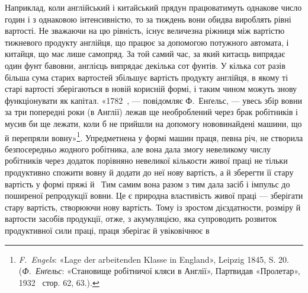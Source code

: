 Наприклад, коли англійський і китайський прядун працюватимуть
однакове число годин і з однаковою інтенсивністю, то за
тиждень вони обидва вироблять рівні вартості. Не зважаючи
на цю рівність, існує величезна ріжниця між вартістю тижневого
продукту англійця, що працює за допомогою потужного
автомата, і китайця, що має лише самопряд. За той самий час,
за який китаєць випрядає один фунт бавовни, англієць випрядає
декілька сот фунтів. У кілька сот разів більша сума старих вартостей
збільшує вартість продукту англійця, в якому ті старі
вартості зберігаються в новій корисній формі, і таким чином
можуть знову функціонувати як капітал. «1782~, — повідомляє
Ф.~Енґельс, — увесь збір вовни за три попередні роки (в Англії)
лежав ще необроблений через брак робітників і мусив би ще лежати,
коли б не прийшли на допомогу нововинайдені машини, що
й перепряли вовну»\footnote{
\emph{F.~Engels}: «Lage der arbeitenden Klasse in England», Leipzig
1845, S. 20. (\emph{Ф.~Енґельс}: «Становище робітничої кляси в Англії», Партвидав
«Пролетар», 1932~ стор. 62, 63.).
}. Упредметнена у формі машин праця,
певна річ, не створила безпосередньо жодного робітника, але
вона дала змогу невеликому числу робітників через додаток
порівняно невеликої кількости живої праці не тільки продуктивно
спожити вовну й додати до неї нову вартість, а й зберегти її стару
вартість у формі пряжі й~ Тим самим вона разом з тим дала
засіб і імпульс до поширеної репродукції вовни. Це є природна
властивість живої праці — зберігати стару вартість, створюючи
нову вартість. Тому із зростом дієздатности, розміру й вартости
засобів продукції, отже, з акумуляцією, яка супроводить розвиток
продуктивної сили праці, праця зберігає й увіковічнює в
